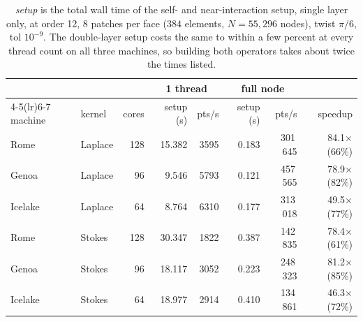 \documentclass[11pt]{article}
\begin{document}
\begin{table}[H]\centering\small
\begin{tabular}{@{}llrrrrrr@{}}
\toprule
 & & & \multicolumn{2}{c}{1 thread} & \multicolumn{2}{c}{full node} & \\
\cmidrule(lr){4-5}\cmidrule(lr){6-7}
machine & kernel & cores & setup (s) & pts/s & setup (s) & pts/s & speedup \\
\midrule
Rome    & Laplace & 128 & 15.382 & 3595 & 0.183 & 301\,645 & 84.1$\times$ (66\%) \\
Genoa   & Laplace &  96 &  9.546 & 5793 & 0.121 & 457\,565 & 78.9$\times$ (82\%) \\
Icelake & Laplace &  64 &  8.764 & 6310 & 0.177 & 313\,018 & 49.5$\times$ (77\%) \\
\addlinespace
Rome    & Stokes  & 128 & 30.347 & 1822 & 0.387 & 142\,835 & 78.4$\times$ (61\%) \\
Genoa   & Stokes  &  96 & 18.117 & 3052 & 0.223 & 248\,323 & 81.2$\times$ (85\%) \\
Icelake & Stokes  &  64 & 18.977 & 2914 & 0.410 & 134\,861 & 46.3$\times$ (72\%) \\
\bottomrule
\end{tabular}
\caption{\emph{setup} is the total wall time of the self- and near-interaction setup, single layer only,
at order 12, 8 patches per face ($384$ elements, $N=55{,}296$ nodes), twist $\pi/6$, tol
$10^{-9}$. The double-layer setup costs the same to within a few percent at every thread count on all three
machines, so building both operators takes about twice the times listed.}
\end{table}
\end{document}
